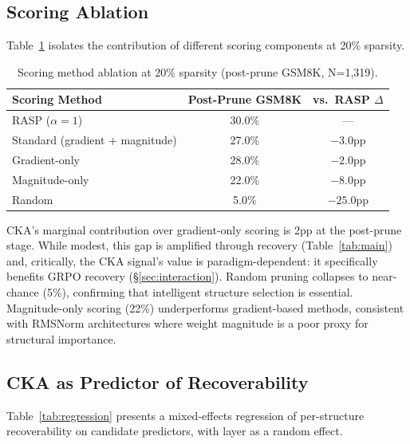 \documentclass[11pt]{article}
\begin{document}
\subsection{Scoring Ablation}
\label{sec:ablation}

Table~\ref{tab:ablation} isolates the contribution of different scoring components at 20\% sparsity.

\begin{table}[t]
\centering
\caption{Scoring method ablation at 20\% sparsity (post-prune GSM8K, N=1,319).}
\label{tab:ablation}
\begin{tabular}{lcc}
\toprule
\textbf{Scoring Method} & \textbf{Post-Prune GSM8K} & \textbf{vs.\ RASP $\Delta$} \\
\midrule
RASP ($\alpha{=}1$) & 30.0\% & --- \\
Standard (gradient + magnitude) & 27.0\% & $-3.0$pp \\
Gradient-only & 28.0\% & $-2.0$pp \\
Magnitude-only & 22.0\% & $-8.0$pp \\
Random & 5.0\% & $-25.0$pp \\
\bottomrule
\end{tabular}
\end{table}

CKA's marginal contribution over gradient-only scoring is 2pp at the post-prune stage. While modest, this gap is amplified through recovery (Table~\ref{tab:main}) and, critically, the CKA signal's value is paradigm-dependent: it specifically benefits GRPO recovery (\S\ref{sec:interaction}). Random pruning collapses to near-chance (5\%), confirming that intelligent structure selection is essential. Magnitude-only scoring (22\%) underperforms gradient-based methods, consistent with RMSNorm architectures where weight magnitude is a poor proxy for structural importance.

\subsection{CKA as Predictor of Recoverability}
\label{sec:regression}

Table~\ref{tab:regression} presents a mixed-effects regression of per-structure recoverability on candidate predictors, with layer as a random effect.
\end{document}
